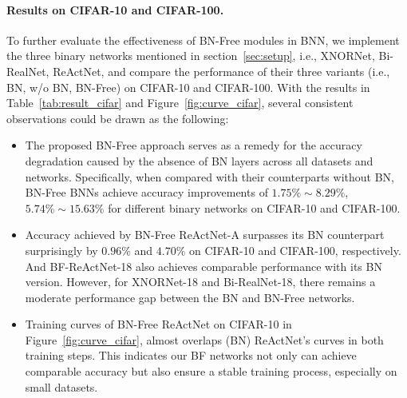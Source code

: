 \documentclass[final]{cvpr}
\begin{document}
\paragraph{Results on CIFAR-10 and CIFAR-100.} To further evaluate the effectiveness of BN-Free modules in BNN, we implement the three binary networks mentioned in section~\ref{sec:setup}, i.e., XNORNet, Bi-RealNet, ReActNet, and compare the performance of their three variants (i.e., BN, w/o BN, BN-Free) on CIFAR-10 and CIFAR-100. With the results in Table~\ref{tab:result_cifar} and Figure~\ref{fig:curve_cifar}, several consistent observations could be drawn as the following:
\begin{itemize}
    \item The proposed BN-Free approach serves as a remedy for the accuracy degradation caused by the absence of BN layers across all datasets and networks. Specifically, when compared with their counterparts without BN, BN-Free BNNs achieve accuracy improvements of $1.75\%\sim8.29\%$, $5.74\%\sim15.63\%$ for different binary networks on CIFAR-10 and CIFAR-100.
    \item Accuracy achieved by BN-Free ReActNet-A surpasses its BN counterpart surprisingly by $0.96\%$ and $4.70\%$ on CIFAR-10 and CIFAR-100, respectively. And BF-ReActNet-18 also achieves comparable performance with its BN version. However, for XNORNet-18 and Bi-RealNet-18, there remains a moderate performance gap between the BN and BN-Free networks. 
\item Training curves of BN-Free ReActNet on CIFAR-10 in Figure~\ref{fig:curve_cifar}, almost overlaps (BN) ReActNet's curves in both training steps. This indicates our BF networks not only can achieve comparable accuracy but also ensure a stable training process, especially on small datasets.
\end{itemize}

\begin{table}[t]
\caption{\small Comparison of the top-1 accuracy between the three variants (i.e., BN, w/o BN, BN-Free) of binary networks on CIFAR-10 and CIFAR-100. All networks are modified from ResNet-18 except for ReActNet-A, which is constructed from MobileNetv1.}
\vspace{1mm}
\label{tab:result_cifar}
\centering
{}
\end{table}
\end{document}
